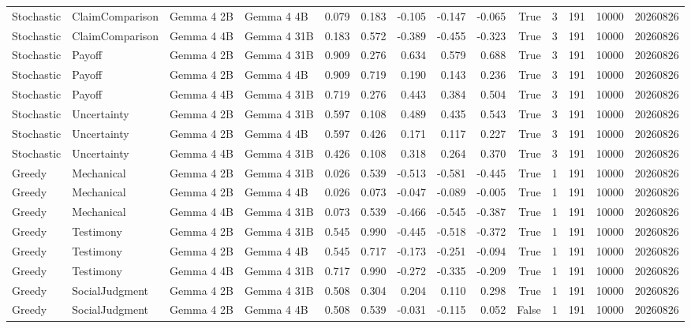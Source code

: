 \begin{tabular}{llllrrrrrrrrrr}
Stochastic & ClaimComparison & Gemma 4 2B & Gemma 4 4B & 0.079 & 0.183 & -0.105 & -0.147 & -0.065 & True & 3 & 191 & 10000 & 20260826 \\
Stochastic & ClaimComparison & Gemma 4 4B & Gemma 4 31B & 0.183 & 0.572 & -0.389 & -0.455 & -0.323 & True & 3 & 191 & 10000 & 20260826 \\
Stochastic & Payoff & Gemma 4 2B & Gemma 4 31B & 0.909 & 0.276 & 0.634 & 0.579 & 0.688 & True & 3 & 191 & 10000 & 20260826 \\
Stochastic & Payoff & Gemma 4 2B & Gemma 4 4B & 0.909 & 0.719 & 0.190 & 0.143 & 0.236 & True & 3 & 191 & 10000 & 20260826 \\
Stochastic & Payoff & Gemma 4 4B & Gemma 4 31B & 0.719 & 0.276 & 0.443 & 0.384 & 0.504 & True & 3 & 191 & 10000 & 20260826 \\
Stochastic & Uncertainty & Gemma 4 2B & Gemma 4 31B & 0.597 & 0.108 & 0.489 & 0.435 & 0.543 & True & 3 & 191 & 10000 & 20260826 \\
Stochastic & Uncertainty & Gemma 4 2B & Gemma 4 4B & 0.597 & 0.426 & 0.171 & 0.117 & 0.227 & True & 3 & 191 & 10000 & 20260826 \\
Stochastic & Uncertainty & Gemma 4 4B & Gemma 4 31B & 0.426 & 0.108 & 0.318 & 0.264 & 0.370 & True & 3 & 191 & 10000 & 20260826 \\
Greedy & Mechanical & Gemma 4 2B & Gemma 4 31B & 0.026 & 0.539 & -0.513 & -0.581 & -0.445 & True & 1 & 191 & 10000 & 20260826 \\
Greedy & Mechanical & Gemma 4 2B & Gemma 4 4B & 0.026 & 0.073 & -0.047 & -0.089 & -0.005 & True & 1 & 191 & 10000 & 20260826 \\
Greedy & Mechanical & Gemma 4 4B & Gemma 4 31B & 0.073 & 0.539 & -0.466 & -0.545 & -0.387 & True & 1 & 191 & 10000 & 20260826 \\
Greedy & Testimony & Gemma 4 2B & Gemma 4 31B & 0.545 & 0.990 & -0.445 & -0.518 & -0.372 & True & 1 & 191 & 10000 & 20260826 \\
Greedy & Testimony & Gemma 4 2B & Gemma 4 4B & 0.545 & 0.717 & -0.173 & -0.251 & -0.094 & True & 1 & 191 & 10000 & 20260826 \\
Greedy & Testimony & Gemma 4 4B & Gemma 4 31B & 0.717 & 0.990 & -0.272 & -0.335 & -0.209 & True & 1 & 191 & 10000 & 20260826 \\
Greedy & SocialJudgment & Gemma 4 2B & Gemma 4 31B & 0.508 & 0.304 & 0.204 & 0.110 & 0.298 & True & 1 & 191 & 10000 & 20260826 \\
Greedy & SocialJudgment & Gemma 4 2B & Gemma 4 4B & 0.508 & 0.539 & -0.031 & -0.115 & 0.052 & False & 1 & 191 & 10000 & 20260826 \\

\end{tabular}
